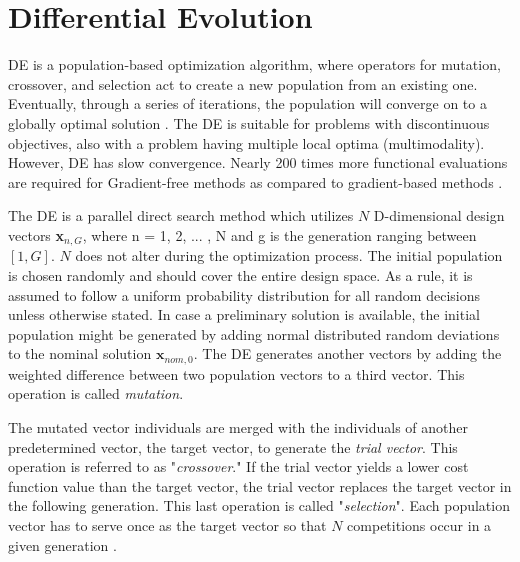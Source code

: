 \section{Differential Evolution}
DE is a population-based optimization algorithm, where operators for mutation, crossover, and selection act to create a new population from an existing one. Eventually, through a series of iterations, the population will converge on to a globally optimal solution \cite{Poole3}. The DE is suitable for problems with discontinuous objectives, also with a problem having multiple local optima (multimodality). However, DE has slow convergence. Nearly 200 times more functional evaluations are required for Gradient-free methods as compared to gradient-based methods \cite{oleg}.

The DE is a parallel direct search method which utilizes $N$
D-dimensional design vectors \textbf{x$_{n,G}$}, where n = 1, 2, ... , N and g is the generation ranging between $[1, G]$. $N$ does not alter during the optimization
process. The initial population is chosen randomly and should cover the entire design space. As a rule, it is assumed to follow a uniform probability distribution for all random decisions unless otherwise stated. In case a preliminary solution is available, the initial population might be generated by adding normal distributed random deviations to the nominal solution $\textbf{x}_{nom,0}$. The DE generates another vectors by adding the weighted difference between two population vectors to a third vector. This operation is called \textit{mutation}.

The mutated vector individuals are merged with the individuals of another predetermined vector, the target vector, to generate the \textit{trial vector}. This operation is referred to as "\textit{crossover}." If the trial vector yields a lower cost function value than the target vector, the trial vector replaces the target vector in the following generation. This last operation is called "\textit{selection}". Each population vector has to serve once as the target vector so that $ N $ competitions occur in a given generation \cite{storn}.

